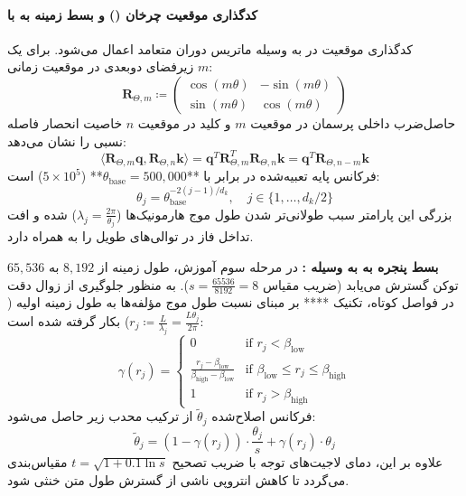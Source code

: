 \paragraph*{کدگذاری موقعیت چرخان () و بسط زمینه به  با }
کدگذاری موقعیت در  به وسیله ماتریس دوران متعامد  \cite{su2024roformer} اعمال می‌شود. برای یک زیرفضای دوبعدی در موقعیت زمانی $m$:
\begin{equation}
    \mathbf{R}_{\Theta, m} \coloneqq \begin{pmatrix} \cos(m\theta) & -\sin(m\theta) \\ \sin(m\theta) & \cos(m\theta) \end{pmatrix}
\end{equation}
حاصل‌ضرب داخلی پرسمان در موقعیت $m$ و کلید در موقعیت $n$ خاصیت انحصار فاصله نسبی را نشان می‌دهد:
\begin{equation}
    \langle \mathbf{R}_{\Theta, m}\mathbf{q}, \mathbf{R}_{\Theta, n}\mathbf{k} \rangle = \mathbf{q}^T \mathbf{R}_{\Theta, m}^T \mathbf{R}_{\Theta, n} \mathbf{k} = \mathbf{q}^T \mathbf{R}_{\Theta, n-m} \mathbf{k}
\end{equation}
فرکانس پایه تعبیه‌شده در  برابر با **$\theta_{\text{base}} = 500{,}000$** ($5 \times 10^5$) است:
\begin{equation}
    \theta_j = \theta_{\text{base}}^{-2(j-1)/d_k}, \quad j \in \{1, \dots, d_k/2\}
\end{equation}
بزرگی این پارامتر سبب طولانی‌تر شدن طول موج هارمونیک‌ها ($\lambda_j = \frac{2\pi}{\theta_j}$) شده و افت تداخل فاز در توالی‌های طویل را به همراه دارد.

\textbf{بسط پنجره به  به وسیله :}
در مرحله سوم آموزش، طول زمینه از $8{,}192$ به $65{,}536$ توکن گسترش می‌یابد (ضریب مقیاس $s = \frac{65536}{8192} = 8$). به منظور جلوگیری از زوال دقت در فواصل کوتاه، تکنیک **** \cite{peng2023yarn} بر مبنای نسبت طول موج مؤلفه‌ها به طول زمینه اولیه ($r_j \coloneqq \frac{L}{\lambda_j} = \frac{L \theta_j}{2\pi}$) بکار گرفته شده است:
\begin{equation}
    \gamma(r_j) = \begin{cases} 
        0 & \text{if } r_j < \beta_{\text{low}} \\ 
        \frac{r_j - \beta_{\text{low}}}{\beta_{\text{high}} - \beta_{\text{low}}} & \text{if } \beta_{\text{low}} \le r_j \le \beta_{\text{high}} \\ 
        1 & \text{if } r_j > \beta_{\text{high}} 
    \end{cases}
\end{equation}
فرکانس اصلاح‌شده $\tilde{\theta}_j$ از ترکیب محدب زیر حاصل می‌شود:
\begin{equation}
    \tilde{\theta}_j = (1 - \gamma(r_j)) \cdot \frac{\theta_j}{s} + \gamma(r_j) \cdot \theta_j
\end{equation}
علاوه بر این، دمای لاجیت‌های توجه با ضریب تصحیح $t = \sqrt{1 + 0.1 \ln s}$ مقیاس‌بندی می‌گردد تا کاهش انتروپی ناشی از گسترش طول متن خنثی شود.

